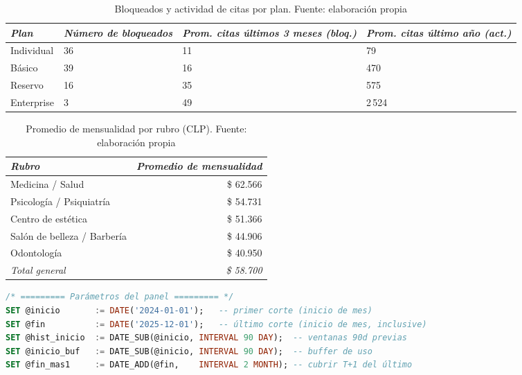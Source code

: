 \begin{appendixd}
\begin{table}[H]
    \centering
    \caption{Bloqueados y actividad de citas por plan. Fuente: elaboración propia}
    \begin{tabular}{|l|C{3.5cm}|C{3.3cm}|C{5.5cm}|}
        \hline
        \textit{Plan} & \textit{Número de bloqueados} & \textit{Prom. citas últimos 3 meses (bloq.)} & \textit{Prom. citas último año (act.)} \bigstrut\\
        \hline
        Individual & 36 & 11 & 79 \bigstrut[t]\\
        Básico & 39 & 16 & 470 \\
        Reservo & 16 & 35 & 575 \\
        Enterprise & 3 & 49 & 2\,524 \bigstrut[b]\\
        \hline
    \end{tabular}
    \label{tab:citas_bloq_act_plan}
\end{table}

\begin{table}[H]
    \centering
    \caption{Promedio de mensualidad por rubro (CLP). Fuente: elaboración propia}
    \begin{tabular}{l r}
        \hline
        \textit{Rubro} & \textit{Promedio de mensualidad} \bigstrut\\
        \hline
        Medicina / Salud & \$ 62.566 \bigstrut[t]\\
        Psicología / Psiquiatría & \$ 54.731 \\
        Centro de estética & \$ 51.366 \\
        Salón de belleza / Barbería & \$ 44.906 \\
        Odontología & \$ 40.950 \\
        \hline
        \textit{Total general} & \textit{\$ 58.700} \bigstrut[b]\\
        \hline
    \end{tabular}
    \label{tab:mensualidad_por_rubro}
\end{table}

\newpage



\begin{lstlisting}[language=SQL, caption={Script SQL para la construcción del Datamart y cálculo de variables.}, label={cod:datamart_sql}]
/* ========= Parámetros del panel ========= */
SET @inicio       := DATE('2024-01-01');   -- primer corte (inicio de mes)
SET @fin          := DATE('2025-12-01');   -- último corte (inicio de mes, inclusive)
SET @hist_inicio  := DATE_SUB(@inicio, INTERVAL 90 DAY);  -- ventanas 90d previas
SET @inicio_buf   := DATE_SUB(@inicio, INTERVAL 90 DAY);  -- buffer de uso
SET @fin_mas1     := DATE_ADD(@fin,    INTERVAL 2 MONTH); -- cubrir T+1 del último


\end{lstlisting}
\end{appendixd}
